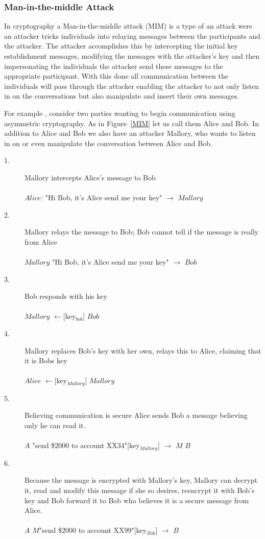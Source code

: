 \documentclass{sig-alternate}
\begin{document}
\subsubsection{Man-in-the-middle Attack}	
In cryptography a Man-in-the-middle attack (MIM) is a type of an attack were an attacker tricks individuals into relaying messages between the participants and the attacker. The attacker accomplishes this by intercepting the initial key establishment messages, modifying the messages with the attacker's key  and then impersonating the individuals the attacker send these messages to the appropriate participant. With this done all communication between the individuals will pass through the attacker enabling the attacker to not only listen in on the conversations but also manipulate and insert their own messages.

For example , consider two parties wanting to begin communication using  asymmetric cryptography. As in Figure~\ref{MIM} let us call them Alice and Bob. In addition to Alice and Bob we also have an attacker Mallory, who wants to listen in on or even manipulate the conversation between Alice and Bob.
	\begin{description}
	\item[1.] Mallory intercepts Alice's message to Bob\hfill\\\\
	$Alice$: "Hi Bob, it's Alice send me your key" $\rightarrow$ $Mallory$
	\item[2.] Mallory relays the message to Bob; Bob cannot tell if the message is really from Alice \hfill\\\\
	 $Mallory$ "Hi Bob, it's Alice send me your key" $\rightarrow$ $Bob$ 	
	\item[3.]Bob responds with his key \hfill\\\\
	$Mallory$ $\leftarrow$[key$_{bob}$]  $Bob$
	\item[4.] Mallory replaces Bob's key with her own, relays this to  Alice, claiming that it is Bobs key\hfill\\\\
	$Alice$ $\leftarrow$[key$_{Mallory}$] $Mallory$
	\item[5.]
	Believing communication is secure Alice sends Bob a message believing only he can read it. \hfill\\\\
	$A$ "send \$2000 to account XX34"[key$_{Mallory}$] $\rightarrow$ $M$ $B$
	\item[6.] Because the message is encrypted with Mallory's key, Mallory can decrypt it, read and modify this message if she so desires, reencrypt it with Bob's key and Bob forward it to Bob who believes it is a secure message from Alice. \hfill\\\\
	$A$ $M$"send \$2000 to account XX99"[key$_{Bob}$] $\rightarrow$ $B$
	\end{description}	
\end{document}
